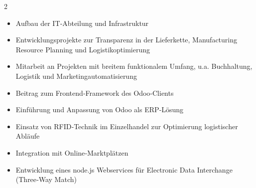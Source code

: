 \documentclass[10pt,a4paper,ragged2e,withhyper]{altacv}
\begin{document}


\makecvheader
{}
\begin{paracol}{2}


\begin{itemize}
\item Aufbau der IT‑Abteilung und Infrastruktur
\item Entwicklungsprojekte zur Transparenz in der Lieferkette, Manufacturing Resource Planning und Logistikoptimierung
\end{itemize}

\divider

\begin{itemize}
\item Mitarbeit an Projekten mit breitem funktionalem Umfang, u.a. Buchhaltung, Logistik und Marketingautomatisierung
\item Beitrag zum Frontend‑Framework des Odoo‑Clients
\end{itemize}

\divider

\begin{itemize}
\item Einführung und Anpassung von Odoo als ERP‑Lösung
\item Einsatz von RFID‑Technik im Einzelhandel zur Optimierung logistischer Abläufe
\item Integration mit Online‑Marktplätzen
\end{itemize}

\divider

\begin{itemize}
\item Entwicklung eines node.js Webservices für Electronic Data Interchange (Three‑Way Match)
\end{itemize}


\end{paracol}
\end{document}
